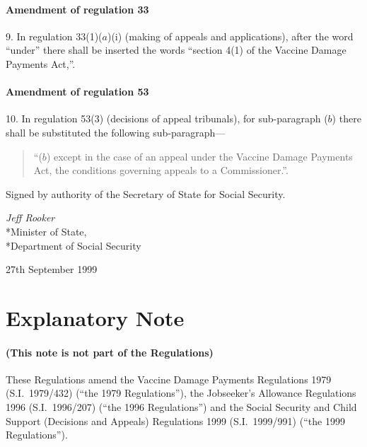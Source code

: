 \documentclass[12pt,a4paper]{article}
\begin{document}
\subsection[9. Amendment of regulation 33]{Amendment of regulation 33}

9.  In regulation 33(1)($a$)(i) (making of appeals and applications), after the word “under” there shall be inserted the words “section 4(1) of the Vaccine Damage Payments Act,”.

\subsection[10. Amendment of regulation 53]{Amendment of regulation 53}

10.  In regulation 53(3) (decisions of appeal tribunals), for sub-paragraph ($b$) there shall be substituted the following sub-paragraph—
\begin{quotation}
“($b$) except in the case of an appeal under the Vaccine Damage Payments Act, the conditions governing appeals to a Commissioner.”.
\end{quotation}

\bigskip

Signed 
by authority of the Secretary of State for Social Security.

{\raggedleft
\emph{Jeff Rooker
}\\*Minister of State,\\*Department of Social Security

}

27th September 1999

\small

\part{Explanatory Note}

\renewcommand\parthead{--- Explanatory Note}

\subsection*{(This note is not part of the Regulations)}

These Regulations amend the Vaccine Damage Payments Regulations 1979 (S.I.\ 1979/432) (“the 1979 Regulations”), the Jobseeker’s Allowance Regulations 1996 (S.I.\ 1996/207) (“the 1996 Regulations”) and the Social Security and Child Support (Decisions and Appeals) Regulations 1999 (S.I.\ 1999/991) (“the 1999 Regulations”).
\end{document}
